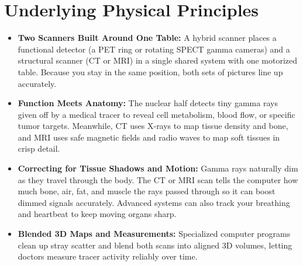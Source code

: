 \section{Underlying Physical Principles}
\begin{itemize}
    \item \textbf{Two Scanners Built Around One Table:} A hybrid scanner places a functional detector (a PET ring or rotating SPECT gamma cameras) and a structural scanner (CT or MRI) in a single shared system with one motorized table. Because you stay in the same position, both sets of pictures line up accurately.
    \item \textbf{Function Meets Anatomy:} The nuclear half detects tiny gamma rays given off by a medical tracer to reveal cell metabolism, blood flow, or specific tumor targets. Meanwhile, CT uses X-rays to map tissue density and bone, and MRI uses safe magnetic fields and radio waves to map soft tissues in crisp detail.
    \item \textbf{Correcting for Tissue Shadows and Motion:} Gamma rays naturally dim as they travel through the body. The CT or MRI scan tells the computer how much bone, air, fat, and muscle the rays passed through so it can boost dimmed signals accurately. Advanced systems can also track your breathing and heartbeat to keep moving organs sharp.
    \item \textbf{Blended 3D Maps and Measurements:} Specialized computer programs clean up stray scatter and blend both scans into aligned 3D volumes, letting doctors measure tracer activity reliably over time.
\end{itemize}

